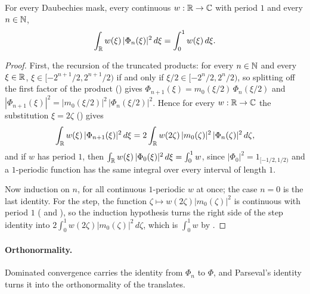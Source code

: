 \begin{proposition}
\label{prop:daub-trunc-integral}
\leanok
{}
For every Daubechies mask, every continuous $w : \mathbb{R} \to \mathbb{C}$ with period $1$ and every
$n \in \mathbb{N}$,
\[
  \int_{\mathbb{R}} w(\xi) \, |\Phi_n(\xi)|^2 \, d\xi = \int_0^1 w(\xi) \, d\xi .
\]
\end{proposition}

\begin{proof}
\leanok
{}
First, the recursion of the truncated products: for every $n \in \mathbb{N}$ and every $\xi \in \mathbb{R}$,
$\xi \in [-2^{n+1}/2, 2^{n+1}/2)$ if and only if $\xi/2 \in [-2^n/2, 2^n/2)$, so splitting off
the first factor of the product () gives
$\Phi_{n+1}(\xi) = m_0(\xi/2) \, \Phi_n(\xi/2)$ and
$|\Phi_{n+1}(\xi)|^2 = |m_0(\xi/2)|^2 \, |\Phi_n(\xi/2)|^2$. Hence for every $w : \mathbb{R} \to \mathbb{C}$
the substitution $\xi = 2\zeta$ () gives
\[
  \int_{\mathbb{R}} w(\xi) \, |\Phi_{n+1}(\xi)|^2 \, d\xi
  = 2 \int_{\mathbb{R}} w(2\zeta) \, |m_0(\zeta)|^2 \, |\Phi_n(\zeta)|^2 \, d\zeta ,
\]
and if $w$ has period $1$, then $\int_{\mathbb{R}} w(\xi) \, |\Phi_0(\xi)|^2 \, d\xi = \int_0^1 w$, since
$|\Phi_0|^2 = 1_{[-1/2, 1/2)}$ and a $1$-periodic function has the same integral over every
interval of length $1$.

Now induction on $n$, for all continuous $1$-periodic $w$ at once; the case $n = 0$ is the last
identity. For the step, the function $\zeta \mapsto w(2\zeta) |m_0(\zeta)|^2$ is continuous with
period $1$ ( and ), so the induction
hypothesis turns the right side of the step identity into
$2 \int_0^1 w(2\zeta) |m_0(\zeta)|^2 \, d\zeta$, which is $\int_0^1 w$ by
.
\end{proof}

\paragraph{Orthonormality.}
Dominated convergence carries the identity from $\Phi_n$ to $\Phi$, and Parseval's identity
turns it into the orthonormality of the translates.

